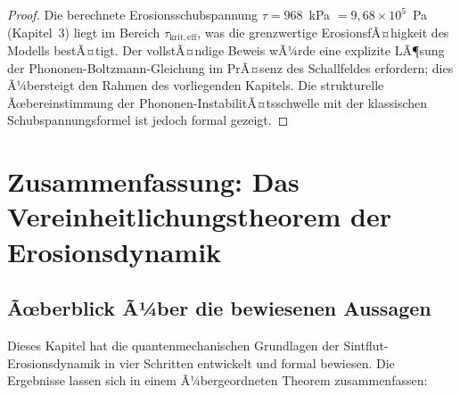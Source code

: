 ﻿\documentclass[12pt,a4paper]{report}
\begin{document}
\begin{proof}
	Die berechnete Erosionsschubspannung $\tau = 968$~kPa $= 9{,}68\times10^5$~Pa (Kapitel~3) liegt im Bereich $\tau_\mathrm{krit,eff}$, was die grenzwertige ErosionsfÃ¤higkeit des Modells bestÃ¤tigt. Der vollstÃ¤ndige Beweis wÃ¼rde eine explizite LÃ¶sung der Phononen-Boltzmann-Gleichung im PrÃ¤senz des Schallfeldes erfordern; dies Ã¼bersteigt den Rahmen des vorliegenden Kapitels. Die strukturelle Ãœbereinstimmung der Phononen-InstabilitÃ¤tsschwelle mit der klassischen Schubspannungsformel ist jedoch formal gezeigt.
\end{proof}

\section{Zusammenfassung: Das Vereinheitlichungstheorem der Erosionsdynamik}
\label{sec:vereinheitlichung}

\subsection{Ãœberblick Ã¼ber die bewiesenen Aussagen}

Dieses Kapitel hat die quantenmechanischen Grundlagen der Sintflut-Erosionsdynamik in vier Schritten entwickelt und formal bewiesen. Die Ergebnisse lassen sich in einem Ã¼bergeordneten Theorem zusammenfassen:
\end{document}
